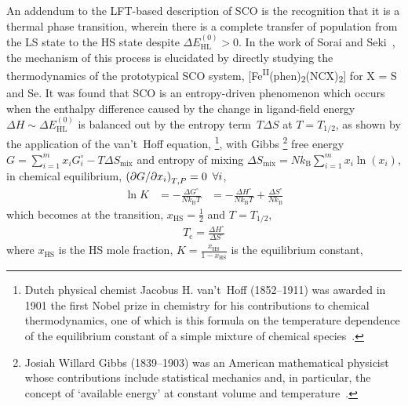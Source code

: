 An addendum to the LFT-based description of SCO is
the recognition that it is a thermal phase transition,
wherein there is a complete transfer of population from
the LS state to the HS state despite $\Delta E_\text{HL}^{(0)} > 0$.
%
In the work of Sorai and Seki~\cite{Sorai1972, Sorai1974},
the mechanism of this process is elucidated
by directly studying the thermodynamics of the prototypical SCO system,
[Fe\textsuperscript{II}(phen)\textsubscript{2}(NCX)\textsubscript{2}] for X = S and Se.
%
It was found that SCO is an entropy-driven phenomenon
which occurs when the enthalpy difference caused by
the change in ligand-field energy~$\Delta H \sim \Delta E_\text{HL}^{(0)}$
is balanced out by the entropy term~$T \Delta S$ at $T = T_{1/2}$,
as shown by the application of the van't~Hoff equation,%
\footnote{Dutch physical chemist Jacobus H. van't~Hoff (1852--1911) was awarded in 1901
the first Nobel prize in chemistry for his contributions to chemical thermodynamics,
one of which is this formula on the temperature dependence of
the equilibrium constant of a simple mixture of chemical species~\cite{Nobel1901}.},
with Gibbs%
\footnote{Josiah Willard Gibbs (1839--1903) was an American mathematical physicist
whose contributions include statistical mechanics and, in particular,
the concept of `available energy' at constant volume and temperature~\cite{GibbsMemoir}.} free
energy $G = \sum_{i = 1}^{m} x_i G_i^\circ - T \Delta S_\text{mix}$
and entropy of mixing $\Delta S_\text{mix} = N k_\text{B} \sum_{i = 1}^{m} x_i \ln(x_i)$,
in chemical equilibrium, $\left( \partial G / \partial x_i \right)_{T, P} = 0 \enskip \forall i$,
%
\begin{equation}
  \begin{aligned}
    \ln K & = - \frac{\Delta G^\circ}{N k_\text{B} T}
      & = -\frac{\Delta H^\circ}{N k_\text{B} T} + \frac{\Delta S^\circ}{N k_\text{B}}
    \label{eq: vant-Hoff1}
  \end{aligned}
\end{equation}
%
which becomes at the transition, $x_\text{HS} = \frac{1}{2}$ and $T = T_\text{1/2}$,
%
\begin{equation}
  \begin{aligned}
    T_\text{c} = \frac{\Delta H^\circ}{\Delta S^\circ}
    \label{eq: vant-Hoff2}
  \end{aligned}
\end{equation}
%
where $x_\text{HS}$ is the HS mole fraction,
$K = \frac{x_\text{HS}}{1 - x_\text{HS}}$ is the equilibrium constant,
